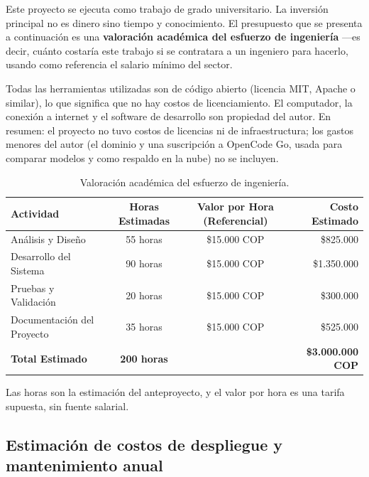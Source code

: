 


Este proyecto se ejecuta como trabajo de grado universitario. La inversión principal no es dinero sino tiempo y conocimiento. El presupuesto que se presenta a continuación es una \textbf{valoración académica del esfuerzo de ingeniería} ---es decir, cuánto costaría este trabajo si se contratara a un ingeniero para hacerlo, usando como referencia el salario mínimo del sector.

Todas las herramientas utilizadas son de código abierto (licencia MIT, Apache o similar), lo que significa que no hay costos de licenciamiento. El computador, la conexión a internet y el software de desarrollo son propiedad del autor. En resumen: el proyecto no tuvo costos de licencias ni de infraestructura; los gastos menores del autor (el dominio y una suscripción a OpenCode Go, usada para comparar modelos y como respaldo en la nube) no se incluyen.

\begin{table}[!htbp]
\centering
\caption{Valoración académica del esfuerzo de ingeniería.}
\label{tab:costo_academico}
\begin{tabular}{|l|c|c|r|}
\hline
\textbf{Actividad} & \textbf{Horas Estimadas} & \textbf{Valor por Hora (Referencial)} & \textbf{Costo Estimado} \\ \hline
Análisis y Diseño & 55 horas & \$15.000 COP & \$825.000 \\ 
Desarrollo del Sistema & 90 horas & \$15.000 COP & \$1.350.000 \\ 
Pruebas y Validación & 20 horas & \$15.000 COP & \$300.000 \\ 
Documentación del Proyecto & 35 horas & \$15.000 COP & \$525.000 \\ \hline
\textbf{Total Estimado} & \textbf{200 horas} & & \textbf{\$3.000.000 COP} \\ \hline
\end{tabular}
\end{table}

\noindent Las horas son la estimación del anteproyecto, y el valor por hora es una tarifa supuesta, sin fuente salarial.

\subsection*{Estimación de costos de despliegue y mantenimiento anual}
\label{sec:costo_despliegue}

